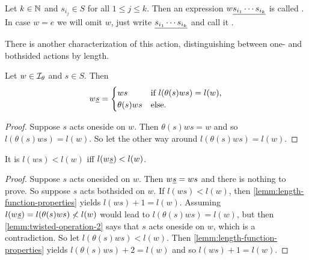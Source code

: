 \begin{defi}
	Let $k \in \mathbb{N}$ and $s_{i_j} \in S$ for all $1 \leq j \leq k$. Then an expression $w \underline{s_{i_1} \cdots s_{i_k}}$ is called . In case $w = e$ we will omit $w$, just write $\underline{s_{i_1} \cdots s_{i_k}}$ and call it .
\end{defi}

There is another characterization of this action, distinguishing between one- and bothsided actions by length.

\begin{lemm}
	Let $w \in \mathcal{I}_{\theta}$ and $s \in S$. Then
	$$ w \underline{s} = \begin{cases}
		ws & \textrm{if } l(\theta(s)ws) = l(w), \\
		\theta(s)ws & \textrm{else}. \\
	\end{cases} $$

	\begin{proof}
		Suppose $s$ acts oneside on $w$. Then $\theta(s)ws = w$ and so $l(\theta(s)ws) = l(w)$. So let the other way around $l(\theta(s)ws) = l(w)$. \todo
	\end{proof}
\end{lemm}

\begin{lemm}
	It is $l(ws) < l(w)$ iff $l(w \underline{s}) < l(w)$.

	\begin{proof}
		Suppose $s$ acts onesided on $w$. Then $w \underline{s} = ws$ and there is nothing to prove. So suppose $s$ acts bothsided on $w$. If $l(ws) < l(w)$, then \ref{lemm:length-function-properties} yields $l(ws) + 1 = l(w)$. Assuming $l(w \underline{s}) = l(\theta(s)ws) \not < l(w)$ would lead to $l(\theta(s)ws) = l(w)$, but then \ref{lemm:twisted-operation-2} says that $s$ acts oneside on $w$, which is a contradiction. So let $l(\theta(s)ws) < l(w)$. Then \ref{lemm:length-function-properties} yields $l(\theta(s)ws) + 2 = l(w)$ and so $l(ws) + 1 = l(w)$.
	\end{proof}
\end{lemm}

